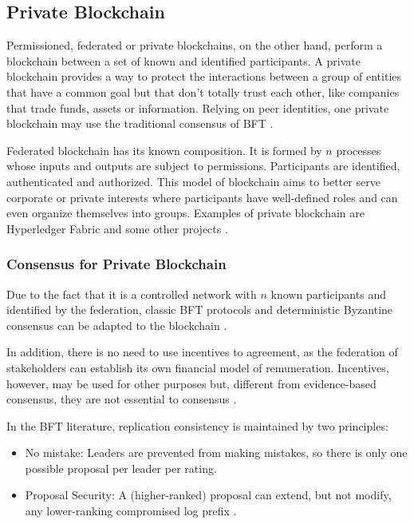 \subsection{Private Blockchain}\label{sec:blockchainPrivada}
Permissioned, federated or private blockchains, on the other hand, perform a blockchain between a set of known and identified participants. A private blockchain provides a way to protect the interactions between a group of entities that have a common goal but that don't totally trust each other, like companies that trade funds, assets or information. Relying on peer identities, one private blockchain may use the traditional consensus of \acf{BFT} \cite{androulaki2018hyperledger}.

Federated blockchain has its known composition. It is formed by $n$ processes whose inputs and outputs are subject to permissions. Participants are identified, authenticated and authorized. This model of blockchain aims to better serve corporate or private interests where participants have well-defined roles and can even organize themselves into groups. Examples of private blockchain are Hyperledger Fabric \cite{cachin2016architecture} and some other projects \cite{cachin2017blockchain}.

\subsubsection{Consensus for Private Blockchain}\label{sec:consensoPrivada}
Due to the fact that it is a controlled network with $n$ known participants and identified by the federation, classic \acf{BFT} protocols and deterministic Byzantine consensus can be adapted to the blockchain \cite{androulaki2018hyperledger}.

In addition, there is no need to use incentives to agreement, as the federation of stakeholders can establish its own financial model of remuneration. Incentives, however, may be used for other purposes but, different from evidence-based consensus, they are not essential to consensus \cite{greve2018blockchain}.

In the \ac{BFT} literature, replication consistency is maintained by two principles:

\begin{itemize}
\item No mistake: Leaders are prevented from making mistakes, so there is only one possible proposal per leader per rating.
\item Proposal Security: A (higher-ranked) proposal can extend, but not modify, any lower-ranking compromised log prefix \cite{abraham2017blockchain}.
\end{itemize}